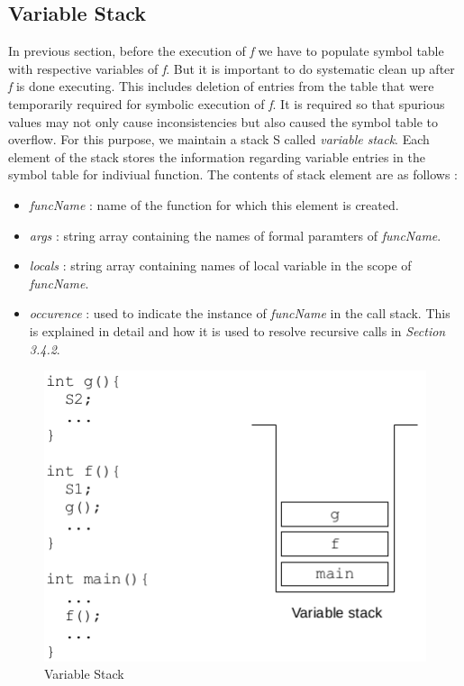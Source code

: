 \documentclass[12pt,oneside]{book}
\begin{document}
\subsection{Variable Stack}
In previous section, before the execution of \textit{f} we have to populate symbol table with respective variables of \textit{f}. But it is important to do systematic clean up after \textit{f} is done executing. This includes deletion of entries from the table that were temporarily required for symbolic execution of \textit{f}. It is required so that spurious values may not only cause inconsistencies but also caused the symbol table to overflow. 
For this purpose, we maintain a stack S called \textit{variable stack}. Each element of the stack stores the information regarding variable entries in the symbol table for indiviual function. The contents of stack element are as follows : 
\begin{itemize}
\setlength\itemsep{0em}
 \item \textit{funcName} : name of the function for which this element is created.
 \item \textit{args} : string array containing the names of formal paramters of \textit{funcName}.
  \item \textit{locals} : string array containing names of local variable in the scope of \textit{funcName}.
  \item \textit{occurence} : used to indicate the instance of \textit{funcName} in the call stack. This is explained in detail and how it is used to resolve recursive calls in \textit{Section 3.4.2}. 
\end{itemize}

\vspace{0.3cm}
\begin{figure}[htbp]
\centering
\includegraphics[scale=0.50]{stack.png}
\caption{Variable Stack}
\end{figure}
\end{document}
